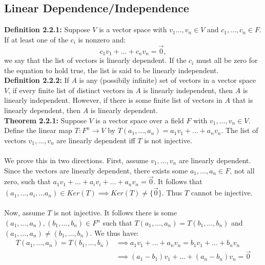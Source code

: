 \documentclass[11pt]{article}
\begin{document}
\newpage

\subsection{Linear Dependence/Independence}

\textbf{Definition 2.2.1:} Suppose $V$ is a vector space with $v_1 \dots , v_n \in V$ and $c_1 , \dots , c_n \in F$. If at least one of the $c_i$ is nonzero and:
\begin{equation*}
    c_1 v_1 + \dots + c_n v_n = \vec{0},
\end{equation*}
we say that the list of vectors is linearly dependent. If the $c_i$ must all be zero for the equation to hold true, the list is said to be linearly independent. \\
\textbf{Definition 2.2.2:} If $A$ is any (possibily infinite) set of vectors in a vector space $V$, if every finite list of distinct vectors in $A$ is linearly independent, then $A$ is linearly independent. However, if there is some finite list of vectors in $A$ that is linearly dependent, then $A$ is linearly dependent. \\
\textbf{Theorem 2.2.1:} Suppose $V$ is a vector space over a field $F$ with $v_1 , \dots, v_n \in V$. Define the linear map $T : F^n \rightarrow V$ by $T(a_1, \dots, a_n) = a_1 v_1 + \dots + a_n v_n$. The list of vectors $v_1, \dots, v_n$ are linearly dependent iff $T$ is not injective. \\
\vspace{0.1cm} \\
We prove this in two directions. First, assume $v_1 , \dots , v_n$ are linearly dependent. Since the vectors are linearly dependent, there exists some $a_1, \dots, a_n \in F$, not all zero, such that $a_1 v_1 + \dots + a_i v_i + \dots + a_n v_n = \vec{0}$. It follows that $(a_1 , \dots , a_i , \dots a_n) \in Ker(T) \implies Ker(T) \neq \{\vec{0}\}$. Thus $T$ cannot be injective. \\
\vspace{0.1cm} \\
Now, assume $T$ is not injective. It follows there is some $(a_1 , \dots , a_n), (b_1 , \dots , b_n) \in F^n$ such that $T(a_1, \dots, a_n) = T(b_1 , \dots , b_n)$ and $(a_1 , \dots , a_n) \neq (b_1 , \dots , b_n)$. We thus have:
\begin{align*}
    T(a_1 , \dots , a_n) = T(b_1 , \dots , b_n) &\implies a_1 v_1 + \dots + a_n v_n = b_1 v_1 + \dots + b_n v_n \\
                                                &\implies (a_1 - b_1) v_1 + \dots + (a_n - b_n) v_n = \vec{0}
\end{align*}
\end{document}
